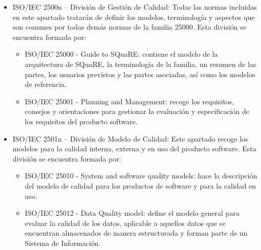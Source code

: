 \documentclass[preprint,12pt]{elsarticle}
\begin{document}
	\begin{itemize}
		\item ISO/IEC 2500n – División de Gestión de Calidad:
		Todas las normas incluidas en este apartado tratarán de definir los modelos, terminología y aspectos que son comunes por todas demás normas de la familia 25000. Esta división se encuentra formada por:
		\begin{itemize}
			\item ISO/IEC 25000 - Guide to SQuaRE: contiene el modelo de la arquitectura de SQuaRE, la terminología de la familia, un resumen de las partes, los usuarios previstos y las partes asociadas, así como los modelos de referencia.
			\item ISO/IEC 25001 - Planning and Management: recoge los requisitos, consejos y orientaciones para gestionar la evaluación y especificación de los requisitos del producto software.
		\end{itemize}
		
		\item ISO/IEC 2501n – División de Modelo de Calidad:
		Este apartado recoge los modelos para la calidad interna, externa y en uso del producto software. Esta división se encuentra formada por:
		\begin{itemize}
			\item ISO/IEC 25010 - System and software quality models: hace la descripción del modelo de calidad para los productos de software y para la calidad en uso.
			\item ISO/IEC 25012 - Data Quality model: define el modelo general para evaluar la calidad de los datos, aplicable a aquellos datos que se encuentran almacenados de manera estructurada y forman parte de un Sistema de Información.
		\end{itemize}
		

\end{itemize}
\end{document}
